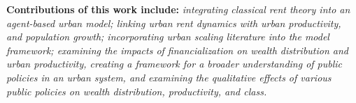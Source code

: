 \textbf{Contributions of this work include:} \textit{integrating classical rent theory into an agent-based urban model; linking urban rent dynamics with urban productivity, and population growth; incorporating urban scaling literature into the model framework; examining the impacts of financialization on wealth distribution and urban productivity, creating a framework for a broader understanding of public policies in an urban system, and examining the qualitative effects of various public policies on wealth distribution, productivity, and class.}



